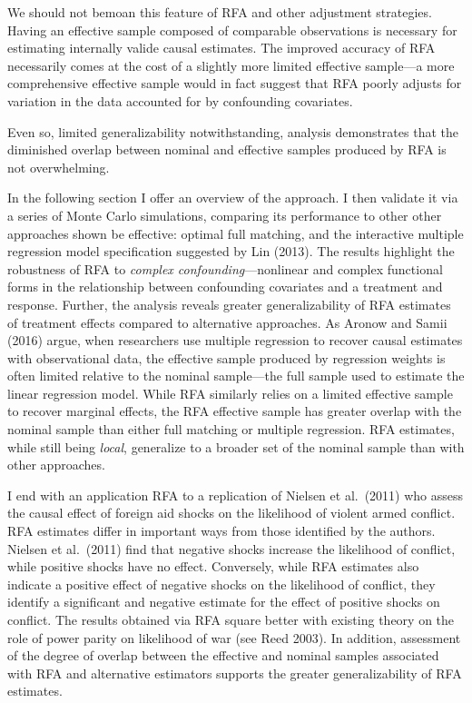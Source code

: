 \documentclass[11pt,]{article}
\begin{document}
We should not bemoan this feature of RFA and other adjustment
strategies. Having an effective sample composed of comparable
observations is necessary for estimating internally valide causal
estimates. The improved accuracy of RFA necessarily comes at the cost of
a slightly more limited effective sample---a more comprehensive
effective sample would in fact suggest that RFA poorly adjusts for
variation in the data accounted for by confounding covariates.

Even so, limited generalizability notwithstanding, analysis demonstrates
that the diminished overlap between nominal and effective samples
produced by RFA is not overwhelming.

In the following section I offer an overview of the approach. I then
validate it via a series of Monte Carlo simulations, comparing its
performance to other other approaches shown be effective: optimal full
matching, and the interactive multiple regression model specification
suggested by Lin (2013). The results highlight the robustness of RFA to
\emph{complex confounding}---nonlinear and complex functional forms in
the relationship between confounding covariates and a treatment and
response. Further, the analysis reveals greater generalizability of RFA
estimates of treatment effects compared to alternative approaches. As
Aronow and Samii (2016) argue, when researchers use multiple regression
to recover causal estimates with observational data, the effective
sample produced by regression weights is often limited relative to the
nominal sample---the full sample used to estimate the linear regression
model. While RFA similarly relies on a limited effective sample to
recover marginal effects, the RFA effective sample has greater overlap
with the nominal sample than either full matching or multiple
regression. RFA estimates, while still being \emph{local}, generalize to
a broader set of the nominal sample than with other approaches.

I end with an application RFA to a replication of Nielsen et al.~(2011)
who assess the causal effect of foreign aid shocks on the likelihood of
violent armed conflict. RFA estimates differ in important ways from
those identified by the authors. Nielsen et al.~(2011) find that
negative shocks increase the likelihood of conflict, while positive
shocks have no effect. Conversely, while RFA estimates also indicate a
positive effect of negative shocks on the likelihood of conflict, they
identify a significant and negative estimate for the effect of positive
shocks on conflict. The results obtained via RFA square better with
existing theory on the role of power parity on likelihood of war (see
Reed 2003). In addition, assessment of the degree of overlap between the
effective and nominal samples associated with RFA and alternative
estimators supports the greater generalizability of RFA estimates.
\end{document}
